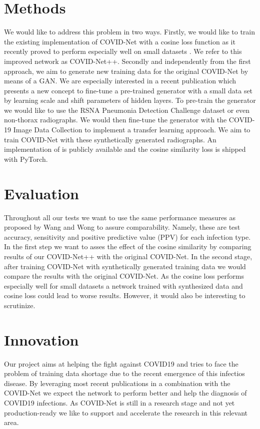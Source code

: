 \documentclass{article}
\begin{document}
\begin{multicols}{2}
\section{Methods}
We would like to address this problem in two ways. Firstly, we would like to train the existing implementation of COVID-Net with a cosine loss function as it recently proved to perform especially well on small datasets  \cite{barz2019deep}. We refer to this improved network as COVID-Net++. Secondly and independently from the first approach, we aim to generate new training data for the original COVID-Net by means of a GAN. We are especially interested in a recent publication \cite{noguchi2019image} which presents a new concept to fine-tune a pre-trained generator with a small data set by learning scale and shift parameters of hidden layers. To pre-train the generator we would like to use the RSNA Pneumonia Detection Challenge dataset or even non-thorax radiographs. We would then fine-tune the generator with the COVID-19 Image Data Collection \cite{cohen2020covid} to implement a transfer learning approach. We aim to train COVID-Net with these synthetically generated radiographs. An implementation of \cite{noguchi2019image} is publicly available and the cosine similarity loss is shipped with PyTorch.

\section{Evaluation}

Throughout all our tests we want to use the same performance measures as proposed by Wang and Wong \cite{wang2020covid} to assure comparability. Namely, these are test accuracy, sensitivity and positive predictive value (PPV) for each infection type. In the first step we want to asses the effect of the cosine similarity by comparing results of our COVID-Net++ with the original COVID-Net. In the second stage, after training COVID-Net with synthetically generated training data we would compare the results with the original COVID-Net. As the cosine loss performs especially well for small datasets a network trained with synthesized data and cosine loss could lead to worse results. However, it would also be interesting to scrutinize.

\section{Innovation}

Our project aims at helping the fight against COVID19 and tries to face the problem of training data shortage due to the recent emergence of this infectios disease. By leveraging most recent publications in a combination with the COVID-Net we expect the network to perform better and help the diagnosis of COVID19 infections. As COVID-Net is still in a research stage and not yet production-ready we like to support and accelerate the research in this relevant area.

\end{multicols}
\printbibliography
\end{document}
